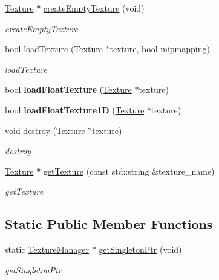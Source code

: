 \begin{DoxyCompactItemize}
\hyperlink{classEngine_1_1Texture}{Texture} $\ast$ \hyperlink{classEngine_1_1TextureManager_a70c993b45da42485bc6ed9fe261717ad}{create\+Empty\+Texture} (void)
\begin{DoxyCompactList}\small\item\em create\+Empty\+Texture \end{DoxyCompactList}\item 
bool \hyperlink{classEngine_1_1TextureManager_ac237a6ee36c75961f4d53f8b7e4674d7}{load\+Texture} (\hyperlink{classEngine_1_1Texture}{Texture} $\ast$texture, bool mipmapping)
\begin{DoxyCompactList}\small\item\em load\+Texture \end{DoxyCompactList}\item 
\hypertarget{classEngine_1_1TextureManager_ab256c020a7297e0bd03b2af12141eb3f}{}bool {\bfseries load\+Float\+Texture} (\hyperlink{classEngine_1_1Texture}{Texture} $\ast$texture)\label{classEngine_1_1TextureManager_ab256c020a7297e0bd03b2af12141eb3f}

\item 
\hypertarget{classEngine_1_1TextureManager_af5db219c01b0f273eb8490df026f8084}{}bool {\bfseries load\+Float\+Texture1\+D} (\hyperlink{classEngine_1_1Texture}{Texture} $\ast$texture)\label{classEngine_1_1TextureManager_af5db219c01b0f273eb8490df026f8084}

\item 
void \hyperlink{classEngine_1_1TextureManager_a6f1dc84a25351f97e4f52ad3b083be32}{destroy} (\hyperlink{classEngine_1_1Texture}{Texture} $\ast$texture)
\begin{DoxyCompactList}\small\item\em destroy \end{DoxyCompactList}\item 
\hyperlink{classEngine_1_1Texture}{Texture} $\ast$ \hyperlink{classEngine_1_1TextureManager_a7f74a36a7e4829c559357a7444927124}{get\+Texture} (const std\+::string \&texture\+\_\+name)
\begin{DoxyCompactList}\small\item\em get\+Texture \end{DoxyCompactList}\end{DoxyCompactItemize}
\subsection*{Static Public Member Functions}
\begin{DoxyCompactItemize}
\item 
static \hyperlink{classEngine_1_1TextureManager}{Texture\+Manager} $\ast$ \hyperlink{classEngine_1_1TextureManager_ad657072ff2e6da88ea9916dd0d13e9d6}{get\+Singleton\+Ptr} (void)
\begin{DoxyCompactList}\small\item\em get\+Singleton\+Ptr \end{DoxyCompactList}\end{DoxyCompactItemize}


